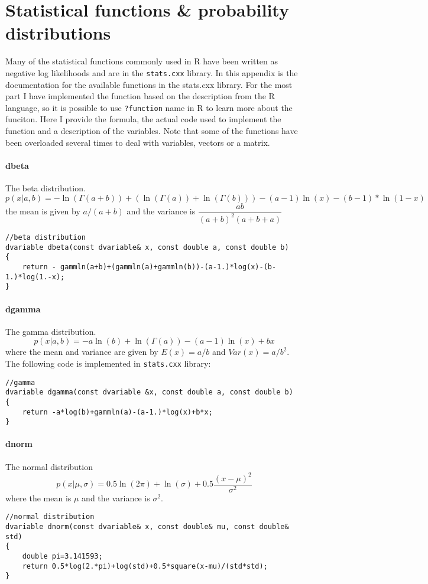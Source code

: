 \section{Statistical functions \& probability distributions}
\begin{multicols}{2}
Many of the statistical functions commonly used in R have been written as negative log likelihoods and are in the \texttt{stats.cxx} library.  In this appendix is the documentation for the available functions in the stats.cxx library.  For the most part I have implemented the function based on the description from the R language, so it is possible to use \texttt{?function} name in R to learn more about the funciton.  Here I provide the formula, the actual code used to implement the function and a description of the variables. Note that some of the functions have been overloaded several times to deal with variables, vectors or a matrix.
\end{multicols}

\paragraph{dbeta} The beta distribution.
\[
	p(x|a,b) = - \ln(\Gamma(a+b))+(\ln(\Gamma(a))+\ln(\Gamma(b)))-(a-1)\ln(x)-(b-1)*\ln(1-x)
\]
the mean is given by $a/(a+b)$ and the variance is $\dfrac{ab}{(a+b)^2(a+b+a)}$
\begin{verbatim}
//beta distribution
dvariable dbeta(const dvariable& x, const double a, const double b)
{
	return - gammln(a+b)+(gammln(a)+gammln(b))-(a-1.)*log(x)-(b-1.)*log(1.-x);
}
\end{verbatim}

\paragraph{dgamma} The gamma distribution.
\[
 p(x|a,b) = -a \ln(b)+\ln(\Gamma(a))-(a-1)\ln(x)+bx
\]
where the mean and variance are given by $E(x) = a/b$ and $Var(x) = a/b^2$. The following code is implemented in \texttt{stats.cxx} library:
\begin{verbatim}
//gamma
dvariable dgamma(const dvariable &x, const double a, const double b)
{
	return -a*log(b)+gammln(a)-(a-1.)*log(x)+b*x;
}
\end{verbatim}


\paragraph{dnorm} The normal distribution
\[
	p(x|\mu,\sigma) = 0.5\ln(2\pi)+\ln(\sigma)+0.5\frac{(x-\mu)^2}{\sigma^2}
\]
where the mean is $\mu$ and the variance is $\sigma^2$.
\begin{verbatim}
//normal distribution
dvariable dnorm(const dvariable& x, const double& mu, const double& std)
{
	double pi=3.141593;
	return 0.5*log(2.*pi)+log(std)+0.5*square(x-mu)/(std*std);
}
\end{verbatim}

